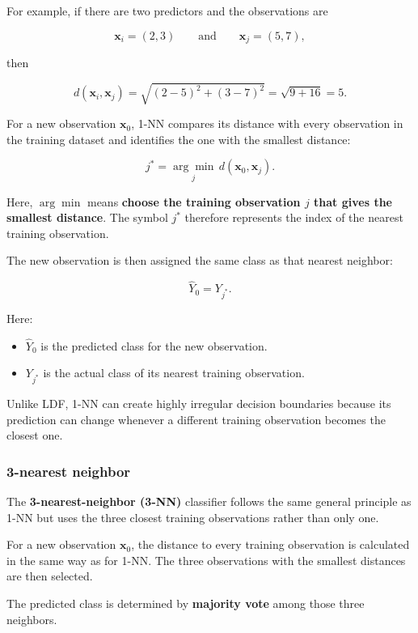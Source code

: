 \documentclass[
  letterpaper,
  DIV=11,
  numbers=noendperiod]{scrreprt}
\providecommand{\tightlist}{%
  \setlength{\itemsep}{0pt}\setlength{\parskip}{0pt}}
\begin{document}
For example, if there are two predictors and the observations are

\[
\mathbf{x}_i=(2,3)
\qquad\text{and}\qquad
\mathbf{x}_j=(5,7),
\]

then

\[
d(\mathbf{x}_i,\mathbf{x}_j)
=
\sqrt{(2-5)^2+(3-7)^2}
=
\sqrt{9+16}
=
5.
\]

For a new observation \(\mathbf{x}_0\), 1-NN compares its distance with
every observation in the training dataset and identifies the one with
the smallest distance:

\[
j^*
=
\underset{j}{\arg\min}\,
d(\mathbf{x}_0,\mathbf{x}_j).
\]

Here, \(\arg\min\) means \textbf{choose the training observation \(j\)
that gives the smallest distance}. The symbol \(j^*\) therefore
represents the index of the nearest training observation.

The new observation is then assigned the same class as that nearest
neighbor:

\[
\widehat{Y}_0=Y_{j^*}.
\]

Here:

\begin{itemize}
\tightlist
\item
  \(\widehat{Y}_0\) is the predicted class for the new observation.
\item
  \(Y_{j^*}\) is the actual class of its nearest training observation.
\end{itemize}

Unlike LDF, 1-NN can create highly irregular decision boundaries because
its prediction can change whenever a different training observation
becomes the closest one.

\subsubsection{3-nearest neighbor}\label{nearest-neighbor-1}

The \textbf{3-nearest-neighbor (3-NN)} classifier follows the same
general principle as 1-NN but uses the three closest training
observations rather than only one.

For a new observation \(\mathbf{x}_0\), the distance to every training
observation is calculated in the same way as for 1-NN. The three
observations with the smallest distances are then selected.

The predicted class is determined by \textbf{majority vote} among those
three neighbors.
\end{document}
